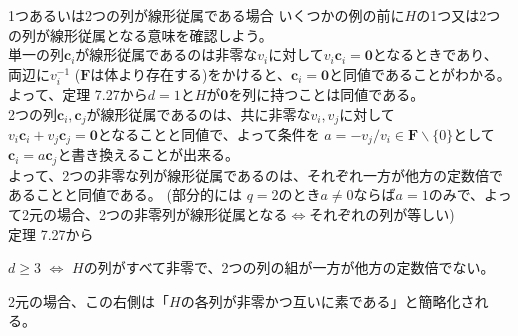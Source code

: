 \documentclass[dvipdfmx,10pt,jsarticle]{beamer}
\newcommand{\F}{\mathbf{F}}
\newcommand{\sets}[1]{\lbrace{}  #1 \rbrace}
\renewcommand{\vec}[1]{\mathbf{#1}}
\begin{document}
  \begin{frame}{1つあるいは2つの列が線形従属である場合}
    いくつかの例の前に$H$の1つ又は2つの列が線形従属となる意味を確認しよう。 \\
    \vspace{1em}
    単一の列$\vec{c}_i$が線形従属であるのは非零な$v_i$に対して$v_i \vec{c}_i = \vec{0}$となるときであり、 \\
    両辺に$v_i^{-1}$ ($\F$は体より存在する)をかけると、$\vec{c}_i = \vec{0}$と同値であることがわかる。 \\
    よって、定理 7.27から$d=1$と$H$が$\vec{0}$を列に持つことは同値である。 \\
    \vspace{1em}
    2つの列$\vec{c}_i, \vec{c}_j$が線形従属であるのは、共に非零な$v_i, v_j$に対して \\
    $v_i \vec{c}_i + v_j \vec{c}_j = \vec{0}$となることと同値で、よって条件を
    $a = - v_j / v_i \in \F \backslash \sets{0}$として$\vec{c}_i = a \vec{c}_j$と書き換えることが出来る。 \\
    よって、2つの非零な列が線形従属であるのは、それぞれ一方が他方の定数倍であることと同値である。 
    (部分的には $q=2$のとき$a \neq 0$ならば$a = 1$のみで、よって2元の場合、2つの非零列が線形従属となる$\Leftrightarrow$それぞれの列が等しい)\\
    \vspace{1em}
    定理 7.27から \\
    \begin{center}
      $d \geq 3$ $\Leftrightarrow$ $H$の列がすべて非零で、2つの列の組が一方が他方の定数倍でない。 \\
    \end{center}
  2元の場合、この右側は「$H$の各列が非零かつ互いに素である」と簡略化される。
  \end{frame}
\end{document}
